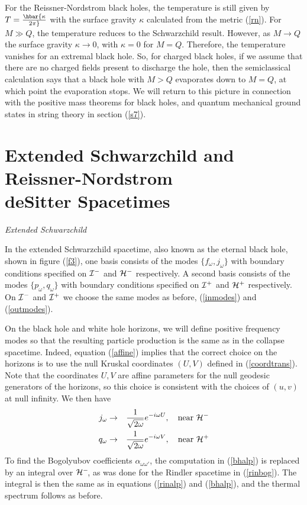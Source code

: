 \documentclass[12pt]{article}
\newcommand{\p}{\partial}
\def\bena{\begin{eqnarray}}
\def\eena{\end{eqnarray}}
\def\fh{{\cal H}^+}
\def\ph{{\cal H}^-}
\def\finf{{\cal I}^+}
\def\pinf{{\cal I}^-}
\def\f{f_{\omega}}
\def\p{p_{\omega}}
\def\q{q_{\omega}}
\def\j{j_{\omega}}
\def\alp{\alpha _{\omega \omega '}}
\begin{document}
For the Reissner-Nordstrom black holes, the temperature is still given by
$T=\hbar
{\kappa\over 2\pi}$ with the surface gravity $\kappa$ calculated from the
metric (\ref{rn}).
For $M\gg Q$, the
temperature reduces to the Schwarzchild result.  However, as $M\rightarrow
Q $ the surface
gravity  $\kappa\rightarrow 0$, with $\kappa =0$ for $M=Q$.
Therefore, the temperature vanishes for an extremal black hole. So, for
charged black holes, if we assume that
there are no charged fields present to discharge the hole, then the
semiclassical calculation says
that a black hole with $M>Q$ evaporates down to $M=Q$, at which point the
evaporation stops.
We will return to this picture in connection with the positive mass
theorems for black
holes, and quantum mechanical ground states in  string theory in section (\ref{s7}).

\section{Extended Schwarzchild and Reissner-Nordstrom\\ deSitter Spacetimes}
\label{section6}

\vskip 0.1in\noindent
{\it Extended Schwarzchild}
\vskip 0.05in

In the extended Schwarzchild spacetime, also known as the eternal black hole,
shown in figure (\ref{f3}), one basis
consists of the modes $\{\f,\j\}$ with boundary conditions specified on
$\pinf$ and $\ph$ respectively.  A
second basis consists of the modes $\{ \p ,\q \}$ with boundary conditions
specified on
$\finf$ and $\fh$ respectively.  On $\pinf$ and $\finf$ we choose the
same modes as before, (\ref{inmodes}) and (\ref{outmodes}).

On the black hole and white hole horizons, we will define positive
frequency modes so that the resulting particle production is the same as
in the collapse spacetime.  Indeed, equation (\ref{affine}) implies that
the correct
choice on the horizons is to use the null Kruskal coordinates $(U,V)$ defined
in (\ref{coordtrans}).  Note that the coordinates $U,V$ are affine
parameters for the null
geodesic generators of the horizons, so this choice is consistent with the
choices of $(u,v)$ at null infinity.  We then have
%
\bena\label{jpmodes} \j &\rightarrow &{1\over \sqrt{2\omega}}e^{-i\omega U},
\quad {\rm near} \  \ph \\
\q &\rightarrow &{1\over \sqrt{2\omega}}e^{-i\omega V}, \quad {\rm near} \
\fh \eena
%
To find the Bogolyubov coefficients $\alp$, the computation in
(\ref{bhalp})  is replaced by
an integral over $\ph\!$, as was done for the Rindler spacetime in
(\ref{rinbog}).
The integral is then the same as in equations (\ref{rinalp})  and
(\ref{bhalp}), and the thermal
spectrum follows as before.
\end{document}
